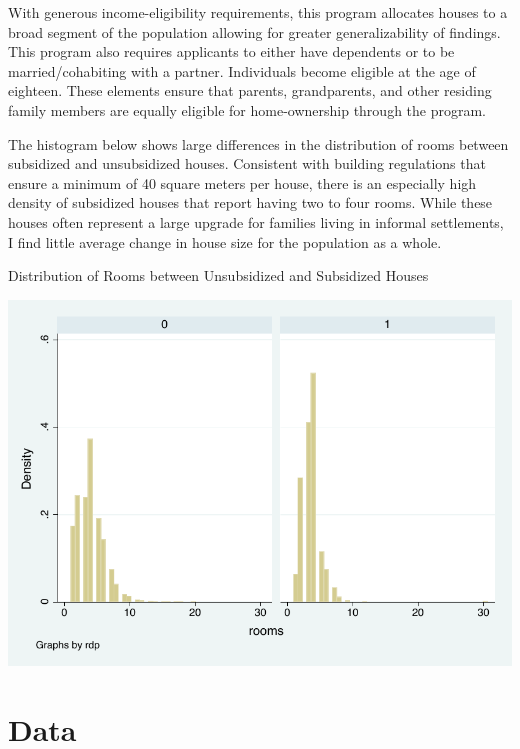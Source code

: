 \documentclass[11pt]{article} %
\begin{document}
With generous income-eligibility requirements, this program allocates houses to a broad segment of the population allowing for greater generalizability of findings.  This program also requires applicants to either have dependents or to be married/cohabiting with a partner.  Individuals become eligible at the age of eighteen.  These elements ensure that parents, grandparents, and other residing family members are equally eligible for home-ownership through the program.  

The histogram below shows large differences in the distribution of rooms between subsidized and unsubsidized houses.  Consistent with building regulations that ensure a minimum of 40 square meters per house, there is an especially high density of subsidized houses that report having two to four rooms.  While these houses often represent a large upgrade for families living in informal settlements, I find little average change in house size for the population as a whole.  

\pagebreak

\begin{center}
	Distribution of Rooms between Unsubsidized and Subsidized Houses
	
	\hspace{1cm}
	
	\includegraphics[scale = 0.9]{figure1.pdf}
\end{center}

\section*{Data}
\end{document}
